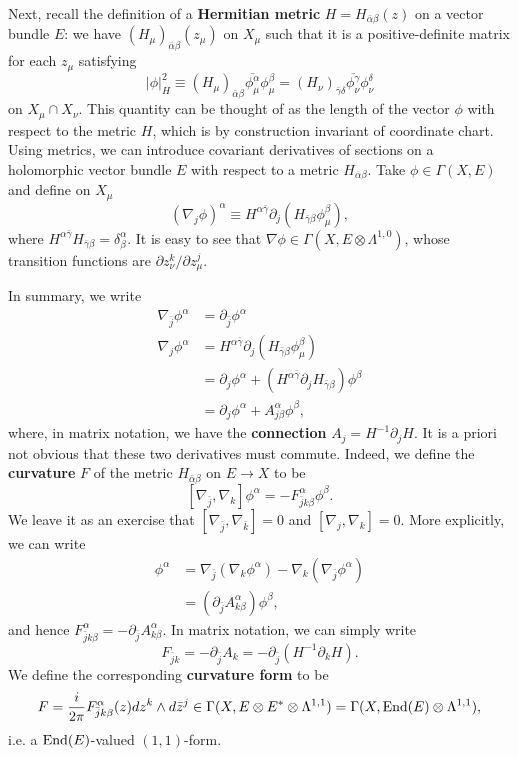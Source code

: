 \documentclass{../mathnotes}
\begin{document}
Next, recall the definition of a \textbf{Hermitian metric} $H=H_{\bar \alpha\beta}(z)$ on a vector bundle $E$: we have $(H_\mu)_{\bar\alpha\beta}(z_\mu)$ on $X_\mu$
such that it is a positive-definite matrix for each $z_\mu$ satisfying
\[|\phi|^2_H\equiv(H_\mu)_{\bar\alpha\beta}\overline{\phi_\mu^\alpha}\phi_\mu^\beta=(H_\nu)_{\bar\gamma\delta}\overline{\phi_\nu^\gamma}\phi_\nu^\delta\]
on $X_\mu\cap X_\nu$.
This quantity can be thought of as the length of the vector $\phi$ with respect to the metric $H$, which is by construction invariant of coordinate chart.
Using metrics, we can introduce covariant derivatives of sections on a holomorphic vector bundle $E$ with respect to a metric $H_{\bar\alpha\beta}$.
Take $\phi\in\Gamma(X,E)$ and define on $X_\mu$
\[(\nabla_j\phi)^\alpha\equiv H^{\alpha\bar\gamma}\partial_j(H_{\bar\gamma\beta}\phi_\mu^\beta),\]
where $H^{\alpha\bar\gamma}H_{\bar\gamma\beta}=\delta^{\alpha}_\beta$. It is easy to see that $\nabla\phi\in\Gamma(X,E\otimes\Lambda^{1,0})$,
whose transition functions are $\partial z_\nu^k/\partial z^j_\mu$.

In summary, we write
\begin{align*}
    \nabla_{\bar j}\phi^{\alpha}&=\partial_{\bar j}\phi^\alpha\\
    \nabla_j\phi^\alpha&=H^{\alpha\bar\gamma}\partial_j(H_{\bar\gamma\beta}\phi_\mu^\beta)\\
    &=\partial_j\phi^\alpha+(H^{\alpha\bar\gamma}\partial_jH_{\bar\gamma\beta})\phi^{\beta}\\
    &=\partial_j\phi^\alpha+A_{j\beta}^\alpha\phi^\beta,
\end{align*}
where, in matrix notation, we have the \textbf{connection} $A_j=H^{-1}\partial_j H$. It is a priori not obvious that these two derivatives
must commute. Indeed, we define the \textbf{curvature} $F$ of the metric $H_{\bar\alpha\beta}$ on $E\to X$ to be
\[ [\nabla_{\bar j},\nabla_k]\phi^\alpha=-F_{\bar jk\beta}^\alpha \phi^\beta.\]
We leave it as an exercise that $[\nabla_{\bar j},\nabla_{\bar k}]=0$ and $[\nabla_j,\nabla_k]=0$. More explicitly,
we can write
\begin{align*}
    [\nabla_{\bar j},\nabla_k]\phi^\alpha&=\nabla_{\bar j}\left( \nabla_k\phi^\alpha \right)-\nabla_k\left( \nabla_{\bar j}\phi^{\alpha} \right)\\
    &=(\partial_{\bar j}A_{k\beta}^\alpha)\phi^{\beta},
\end{align*}
and hence $F_{\bar jk\beta}^\alpha=-\partial_{\bar j}A_{k\beta}^\alpha$. In matrix notation, we can simply write 
\[F_{\bar jk}=-\partial_{\bar j}A_k=-\partial_{\bar j}\left( H^{-1}\partial_k H \right).\]
We define the corresponding \textbf{curvature form} to be
\[F=\frac{i}{2\pi}F_{\bar jk\beta}^\alpha(z)dz^k\wedge d\bar z^j\in\Gamma(X,E\otimes E^*\otimes\Lambda^{1,1})=\Gamma(X,\operatorname{End}(E)\otimes\Lambda^{1,1}),\]
i.e. a $\operatorname{End}(E)$-valued $(1,1)$-form.
\end{document}
